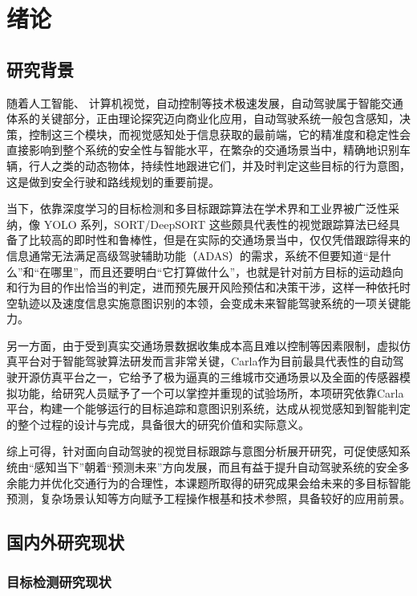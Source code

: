 \chapter{绪论}



\section{研究背景}

随着人工智能、 计算机视觉，自动控制等技术极速发展，自动驾驶属于智能交通体系的关键部分，正由理论探究迈向商业化应用，自动驾驶系统一般包含感知，决策，控制这三个模块，而视觉感知处于信息获取的最前端，它的精准度和稳定性会直接影响到整个系统的安全性与智能水平，在繁杂的交通场景当中，精确地识别车辆，行人之类的动态物体，持续性地跟进它们，并及时判定这些目标的行为意图，这是做到安全行驶和路线规划的重要前提。

当下，依靠深度学习的目标检测和多目标跟踪算法在学术界和工业界被广泛性采纳，像 YOLO 系列，SORT/DeepSORT 这些颇具代表性的视觉跟踪算法已经具备了比较高的即时性和鲁棒性，但是在实际的交通场景当中，仅仅凭借跟踪得来的信息通常无法满足高级驾驶辅助功能（ADAS）的需求，系统不但要知道“是什么”和“在哪里”，而且还要明白“它打算做什么”，也就是针对前方目标的运动趋向和行为目的作出恰当的判定，进而预先展开风险预估和决策干涉，这样一种依托时空轨迹以及速度信息实施意图识别的本领，会变成未来智能驾驶系统的一项关键能力。

另一方面，由于受到真实交通场景数据收集成本高且难以控制等因素限制，虚拟仿真平台对于智能驾驶算法研发而言非常关键，Carla作为目前最具代表性的自动驾驶开源仿真平台之一，它给予了极为逼真的三维城市交通场景以及全面的传感器模拟功能，给研究人员赋予了一个可以掌控并重现的试验场所，本项研究依靠Carla平台，构建一个能够运行的目标追踪和意图识别系统，达成从视觉感知到智能判定的整个过程的设计与完成，具备很大的研究价值和实际意义。

综上可得，针对面向自动驾驶的视觉目标跟踪与意图分析展开研究，可促使感知系统由“感知当下”朝着“预测未来”方向发展，而且有益于提升自动驾驶系统的安全多余能力并优化交通行为的合理性，本课题所取得的研究成果会给未来的多目标智能预测，复杂场景认知等方向赋予工程操作根基和技术参照，具备较好的应用前景。

\section{国内外研究现状}

\subsection{目标检测研究现状}

